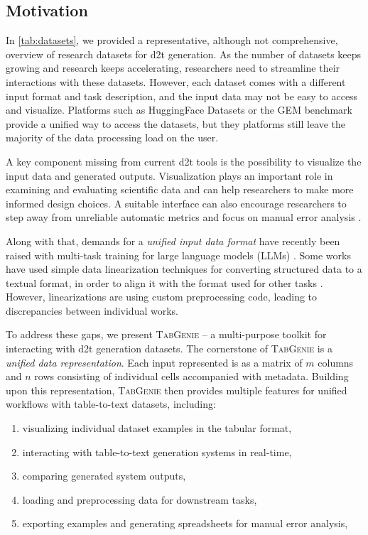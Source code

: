 \subsection{Motivation}
\label{sec:tabgenie:motivation}
In \autoref{tab:datasets}, we provided a representative, although not comprehensive, overview of research datasets for \ac{d2t} generation. As the number of datasets keeps growing and research keeps accelerating, researchers need to streamline their interactions with these datasets. However, each dataset comes with a different input format and task description, and the input data may not be easy to access and visualize.  Platforms such as HuggingFace Datasets \cite{lhoest2021datasets} or the GEM benchmark \cite{gehrmannGEMBenchmarkNatural2021}  provide a unified way to access the datasets, but they platforms still leave the majority of the data processing load on the user.

A key component missing from current \ac{d2t} tools is the possibility to visualize the input data and generated outputs. Visualization plays an important role in examining and evaluating scientific data \cite{Kehrer2013VisualizationAV} and can help researchers to make more informed design choices. A suitable interface can also encourage researchers to step away from unreliable automatic metrics \cite{gehrmannRepairingCrackedFoundation2022} and focus on manual error analysis \cite{van_miltenburg_underreporting_2021,van_miltenburg_barriers_2023}.

Along with that, demands for a \textit{unified input data format} have recently been raised with multi-task training for large language models (LLMs) \citep[\textit{inter alia}]{sanh2021multitask,scao2022bloom,ouyang2022TrainingLM}. Some works have used simple data linearization techniques for converting structured data to a textual format, in order to align it with the format used for other tasks \cite{xieUnifiedSKGUnifyingMultiTasking2022,tang2022mvp}. However, linearizations are using custom preprocessing code, leading to discrepancies between individual works.

To address these gaps, we present \textsc{TabGenie} -- a multi-purpose toolkit for interacting with \ac{d2t} generation datasets. The cornerstone of \textsc{TabGenie} is a \emph{unified data representation}. Each input represented is as a matrix of $m$ columns and $n$ rows consisting of individual cells accompanied with metadata. Building upon this representation, \textsc{TabGenie} then provides multiple features for unified workflows with table-to-text datasets, including:
\begin{enumerate}
    \item visualizing individual dataset examples in the tabular format,
    \item interacting with table-to-text generation systems in real-time,
    \item comparing generated system outputs,
    \item loading and preprocessing data for downstream tasks,
    \item exporting examples and generating spreadsheets for manual error analysis,
\end{enumerate}

